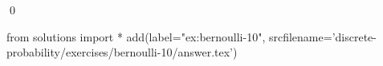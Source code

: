 
\begin{ex} 
  \label{ex:bernoulli-10}
  
  \qed
\end{ex} 
\begin{python0}
from solutions import *
add(label="ex:bernoulli-10",
    srcfilename='discrete-probability/exercises/bernoulli-10/answer.tex') 
\end{python0}
